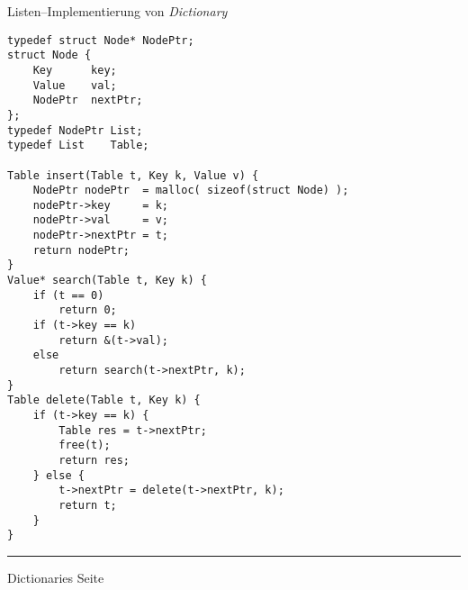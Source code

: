 
\begin{slide}{}
\normalsize

\begin{center}
Listen--Implementierung von \textsl{Dictionary}
\end{center}
\vspace*{0.5cm}

\footnotesize
\begin{verbatim}
typedef struct Node* NodePtr;
struct Node {
    Key      key;
    Value    val;
    NodePtr  nextPtr;
};
typedef NodePtr List;
typedef List    Table;

Table insert(Table t, Key k, Value v) {
    NodePtr nodePtr  = malloc( sizeof(struct Node) );
    nodePtr->key     = k;
    nodePtr->val     = v;
    nodePtr->nextPtr = t;
    return nodePtr;
}
Value* search(Table t, Key k) {
    if (t == 0)       
        return 0;
    if (t->key == k) 
        return &(t->val);
    else 
        return search(t->nextPtr, k);
}
Table delete(Table t, Key k) {
    if (t->key == k) {
        Table res = t->nextPtr;
        free(t);
        return res;
    } else {
        t->nextPtr = delete(t->nextPtr, k);
        return t;
    }
}
\end{verbatim}

\vspace*{\fill}
\tiny \addtocounter{mypage}{1}
\rule{17cm}{1mm}
Dictionaries  \hspace*{\fill} Seite 
\end{slide}


